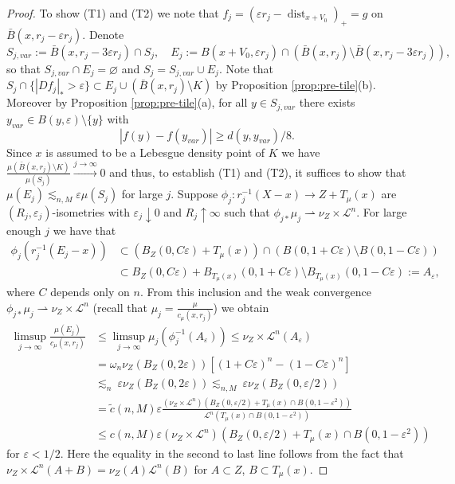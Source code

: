 \documentclass{amsart}
\numberwithin{equation}{section}
\newcommand{\leb}{\mathcal{L}}
\newcommand{\dist}{\operatorname{dist}}
\newcommand{\inv}{^{-1}}
\begin{document}
\begin{proof}
To show (T1) and (T2) we note that $f_j=(\varepsilon r_j-\dist_{x+V_0})_+=g$ on $\bar B(x,r_j-\varepsilon r_j)$. Denote 
\[
S_{j,var}:=\bar B(x,r_j-3\varepsilon r_j)\cap S_j,\quad E_j:=B(x+V_0,\varepsilon r_j)\cap (\bar B(x,r_j)\setminus \bar B(x,r_j-3\varepsilon r_j)),
\]
so that $S_{j,var}\cap E_j=\varnothing$ and $S_j=S_{j,var}\cup E_j$. Note that $S_j\cap \{|Df_j|_\ast>\varepsilon\}\subset E_j\cup(\bar B(x,r_j)\setminus K)$ by Proposition \ref{prop:pre-tile}(b). 
Moreover by Proposition \ref{prop:pre-tile}(a), for all $y\in S_{j,var}$ there exists $y_{var}\in B(y,\varepsilon)\setminus \{y\}$ with 
\[
|f(y)-f(y_{var})|\ge d(y,y_{var})/8.
\]
 Since $x$ is assumed to be a Lebesgue density point of $K$ we have $\frac{\mu(\bar B(x,r_j)\setminus K)}{\mu(S_j)}\stackrel{j\to\infty}{\longrightarrow}0$ and thus, to establish (T1) and (T2), it suffices to show that $\mu(E_j)\lesssim_{n,M} \varepsilon \mu(S_j)$ for large $j$. Suppose $\phi_j:r_j\inv(X-x)\to Z+T_\mu(x)$ are $(R_j,\varepsilon_j)$-isometries with $\varepsilon_j\downarrow 0$ and $R_j\uparrow \infty$ such that $\phi_{j\ast}\mu_j\rightharpoonup\nu_Z\times\leb^n$. For large enough $j$ we have that
\begin{align*}
    \phi_j(r_j\inv(E_j-x))&\subset (B_Z(0,C\varepsilon)+T_\mu(x))\cap (B(0,1+C\varepsilon)\setminus B(0,1-C\varepsilon))\\
    &\subset B_Z(0,C\varepsilon)+B_{T_\mu(x)}(0,1+C\varepsilon)\setminus B_{T_\mu(x)}(0,1-C\varepsilon):=A_\varepsilon,
\end{align*}
where $C$ depends only on $n$. From this inclusion and the weak convergence $\phi_{j\ast}\mu_j\rightharpoonup \nu_Z\times\leb^n$ (recall that $\mu_j=\frac{\mu}{c_\mu(x,r_j)}$) we obtain
\begin{align*}
\limsup_{j\to\infty}\frac{\mu(E_j)}{c_\mu(x,r_j)}&\le \limsup_{j\to\infty}\mu_j(\phi_j\inv(A_\varepsilon))\le \nu_Z\times\leb^n(A_\varepsilon)\\
&= \omega_n\nu_Z(B_Z(0,2\varepsilon))[(1+C\varepsilon)^n-(1-C\varepsilon)^n]\\
&  \lesssim_{n}\ \varepsilon\nu_Z(B_Z(0,2\varepsilon)) \lesssim_{n,M}\ \varepsilon\nu_Z( B_Z(0,\varepsilon/2))\\
&= \tilde c(n,M)\varepsilon \frac{(\nu_Z\times\leb^n)( B_Z(0,\varepsilon/2)+T_\mu(x)\cap  B(0,1-\varepsilon^2))}{\leb^n(T_\mu(x)\cap  B(0,1-\varepsilon^2))}\\
&\le c(n,M)\varepsilon (\nu_Z\times\leb^n)(B_Z(0,\varepsilon/2)+T_\mu(x)\cap  B(0,1-\varepsilon^2))
\end{align*}
 for $\varepsilon<1/2$. Here the equality in the second to last line follows from the fact that $\nu_Z\times \leb^n(A+B)=\nu_Z(A)\leb^n(B)$ for $A\subset Z$, $B\subset T_\mu(x)$.


\end{proof}
\end{document}
